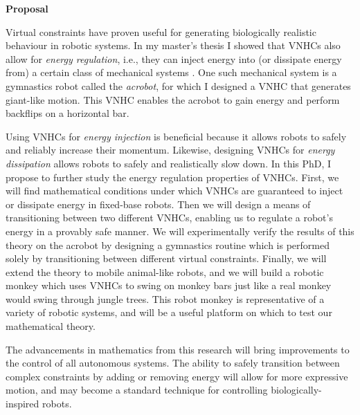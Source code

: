 \documentclass[letterpaper,12pt]{article}
\begin{document}
\begin{large} \textbf{Proposal} \end{large}

Virtual constraints have proven useful for generating biologically realistic
behaviour in robotic systems.
In my master's thesis I showed that VNHCs also allow for 
\textit{energy regulation}, i.e., they can inject energy into (or dissipate
energy from) a certain class of mechanical systems \cite{my-thesis}.
One such mechanical system is a gymnastics robot called the
\textit{acrobot}, for which I designed a VNHC that generates giant-like motion. 
This VNHC enables the acrobot to gain energy and perform backflips on a
horizontal bar.

Using VNHCs for \textit{energy injection} is beneficial because it allows robots to
safely and reliably increase their momentum.
Likewise, designing VNHCs for \textit{energy dissipation} allows robots to
safely and realistically slow down.
In this PhD, I propose to further study the energy regulation properties of VNHCs.
First, we will find mathematical conditions under which VNHCs are guaranteed to
inject or dissipate energy in fixed-base robots.
Then we will design a means of transitioning between two different VNHCs,
enabling us to regulate a robot's energy in a provably safe manner.
We will experimentally verify the results of this theory on the acrobot by
designing a gymnastics routine which is performed solely by transitioning
between different virtual constraints.
Finally, we will extend the theory to mobile animal-like robots,
and we will build a robotic monkey which uses VNHCs to swing on monkey bars just
like a real monkey would swing through jungle trees.
This robot monkey is representative of a variety of robotic systems, and will be
a useful platform on which to test our mathematical theory.

The advancements in mathematics from this research will bring improvements
to the control of all autonomous systems. 
The ability to safely transition between complex constraints by adding or
removing energy will allow for more expressive motion, and may become a standard
technique for controlling biologically-inspired robots.

\newpage
\printbibliography
\end{document}
